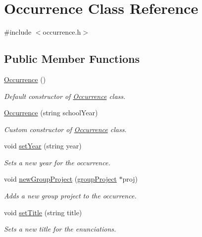 \hypertarget{class_occurrence}{}\section{Occurrence Class Reference}
\label{class_occurrence}


{\ttfamily \#include $<$occurrence.\+h$>$}

\subsection*{Public Member Functions}
\begin{DoxyCompactItemize}
\item 
\hyperlink{class_occurrence_a63911c7c452d1a43cbe135150c8c7764}{Occurrence} ()
\begin{DoxyCompactList}\small\item\em Default constructor of \hyperlink{class_occurrence}{Occurrence} class. \end{DoxyCompactList}\item 
\hyperlink{class_occurrence_aa1aa3a08a982d5c15a14a3fd0dc835fe}{Occurrence} (string school\+Year)
\begin{DoxyCompactList}\small\item\em Custom constructor of \hyperlink{class_occurrence}{Occurrence} class. \end{DoxyCompactList}\item 
void \hyperlink{class_occurrence_a2b5961ee7403112083776b8f4f4b4a14}{set\+Year} (string year)
\begin{DoxyCompactList}\small\item\em Sets a new year for the occurrence. \end{DoxyCompactList}\item 
void \hyperlink{class_occurrence_a7596dd133e475e6dcbb09efd3459ac08}{new\+Group\+Project} (\hyperlink{classgroup_project}{group\+Project} $\ast$proj)
\begin{DoxyCompactList}\small\item\em Adds a new group project to the occurrence. \end{DoxyCompactList}\item 
void \hyperlink{class_occurrence_a2e6912cc206246a4028756d49d0951fb}{set\+Title} (string title)
\begin{DoxyCompactList}\small\item\em Sets a new title for the enunciations. \end{DoxyCompactList}\item 

\end{DoxyCompactItemize}

